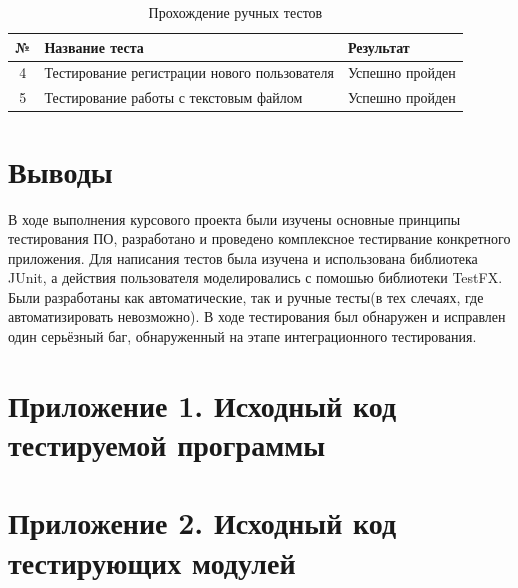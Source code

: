 \documentclass[a4paper,12pt]{article}
\begin{document}
\begin{table}[h!]
	\caption{Прохождение ручных тестов}
	\centering
	\begin{tabular}{|c|l|l|}
	\hline 
	№ &  Название теста & Результат \\ 
	\hline
	4 & Тестирование регистрации нового пользователя & Успешно пройден  \\
	\hline
	5 &  Тестирование работы с текстовым файлом & Успешно пройден  \\
	\hline
\end{tabular} 
\label{table:system_testing_by_hands} 
\end{table}

\newpage\section*{Выводы}
В ходе выполнения курсового проекта были изучены основные принципы тестирования ПО,  разработано и проведено комплексное тестирвание конкретного приложения. Для написания тестов была изучена и использована библиотека JUnit, а действия пользователя моделировались с помошью библиотеки TestFX. Были разработаны как автоматические, так и ручные тесты(в тех слечаях, где автоматизировать невозможно). В ходе тестирования был обнаружен и исправлен один серьёзный баг, обнаруженный на этапе интеграционного тестирования.

\newpage\section*{Приложение 1. Исходный код тестируемой программы}

\newpage\section*{Приложение 2. Исходный код тестирующих модулей}
\end{document}
